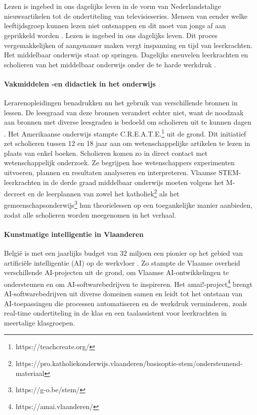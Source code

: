 
\chapter{}%
\label{ch:inleiding}

Lezen is ingebed in ons dagelijks leven in de vorm van Nederlandstalige nieuwsartikelen tot de ondertiteling van televisieseries. Mensen van eender welke leeftijdsgroep kunnen lezen niet ontsnappen en dit moet van jongs af aan geprikkeld worden \autocite{Daoud2023}. Lezen is ingebed in ons dagelijks leven. Dit proces vergemakkelijken of aangenamer maken vergt inspanning en tijd van leerkrachten. Het middelbaar onderwijs staat op springen. Dagelijks sneuvelen leerkrachten en scholieren van het middelbaar onderwijs onder de te harde werkdruk \autocite{Glorieux2018}. 


\subsubsection{Vakmiddelen -en didactiek in het onderwijs}
Lerarenopleidingen benadrukken nu het gebruik van verschillende bronnen in lessen. De leesgraad van deze bronnen verandert echter niet, want de noodzaak aan bronnen met diverse leesgraden is bedoeld om scholieren uit te kunnen dagen \autocite{Surma2019}. Het Amerikaanse onderwijs stampte C.R.E.A.T.E.\footnote{https://teachcreate.org/} uit de grond. Dit initiatief zet scholieren tussen 12 en 18 jaar aan om wetenschappelijke artikelen te lezen in plaats van enkel boeken. Scholieren komen zo in direct contact met wetenschappelijk onderzoek. Ze begrijpen hoe wetenschappers experimenten uitvoeren, plannen en resultaten analyseren en interpreteren. Vlaamse STEM-leerkrachten in de derde graad middelbaar onderwijs moeten volgens het M-decreet en de leerplannen van zowel het katholiek\footnote{https://pro.katholiekonderwijs.vlaanderen/basisoptie-stem/ondersteunend-materiaal} als het gemeenschapsonderwijs\footnote{https://g-o.be/stem/} hun theorielessen op een toegankelijke manier aanbieden, zodat alle scholieren worden meegenomen in het verhaal. 

\subsubsection{Kunstmatige intelligentie in Vlaanderen}
België is met een jaarlijks budget van 32 miljoen een pionier op het gebied van artificiële intelligentie (AI) op de werkvloer \autocite{Crevits2022}. Zo stampte de Vlaamse overheid verschillende AI-projecten uit de grond, om Vlaamse AI-ontwikkelingen te ondersteunen en om AI-softwarebedrijven te inspireren. Het amai!-project\footnote{https://amai.vlaanderen/} brengt AI-softwarebedrijven uit diverse domeinen samen en leidt tot het ontstaan van AI-toepassingen die processen automatiseren en de werkdruk verminderen, zoals real-time ondertiteling in de klas en een taalassistent voor leerkrachten in meertalige klasgroepen.

